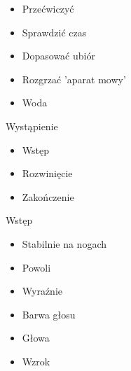 \documentclass{beamer}
\begin{document}
\begin{frame}{}
	\begin{Large}
		\begin{itemize}[<+->]
			\item Przećwiczyć
			\item Sprawdzić czas
			\item Dopasować ubiór \newline
		\end{itemize}
		\begin{itemize}[<+->]
			\item Rozgrzać 'aparat mowy'
			\item Woda
		\end{itemize}
	\end{Large}
\end{frame}

\begin{frame}{}
	\begin{center}
		\Huge{Wystąpienie}
	\end{center}
\end{frame}

\begin{frame}{}
	\begin{Large}
		\begin{itemize}
			\item Wstęp
			\item Rozwinięcie
			\item Zakończenie
		\end{itemize}
	\end{Large}
\end{frame}

\begin{frame}{}
	\begin{center}
		\Huge{Wstęp}
	\end{center}
\end{frame}

\begin{frame}{}
	\begin{Large}
		\begin{itemize}[<+->]
			\item Stabilnie na nogach
			\item Powoli
			\item Wyraźnie
			\item Barwa głosu
			\item Głowa
			\item Wzrok
		\end{itemize}
	\end{Large}
\end{frame}
\end{document}
